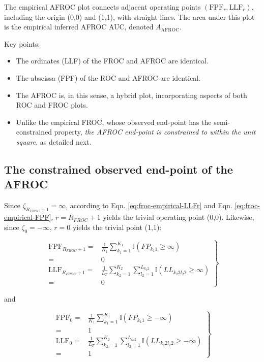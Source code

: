 \documentclass[
]{book}
\providecommand{\tightlist}{%
  \setlength{\itemsep}{0pt}\setlength{\parskip}{0pt}}
\begin{document}
The empirical AFROC plot connects adjacent operating points \(\left( \text{FPF}_r, \text{LLF}_r \right )\), including the origin (0,0) and (1,1), with straight lines. The area under this plot is the empirical inferred AFROC AUC, denoted \(A_{\text{AFROC}}\).

Key points:

\begin{itemize}
\tightlist
\item
  The ordinates (LLF) of the FROC and AFROC are identical.
\item
  The abscissa (FPF) of the ROC and AFROC are identical.
\item
  The AFROC is, in this sense, a hybrid plot, incorporating aspects of both ROC and FROC plots.
\item
  Unlike the empirical FROC, whose observed end-point has the semi-constrained property, \emph{the AFROC end-point is constrained to within the unit square}, as detailed next.
\end{itemize}

\hypertarget{froc-empirical-AFROC-constrained}{%
\subsection{The constrained observed end-point of the AFROC}\label{froc-empirical-AFROC-constrained}}

Since \(\zeta_{R_{FROC}+1} = \infty\), according to Eqn. \eqref{eq:froc-empirical-LLFr} and Eqn. \eqref{eq:froc-empirical-FPF}, \(r = R_{FROC}+1\) yields the trivial operating point (0,0). Likewise, since \(\zeta_0 = -\infty\), \(r = 0\) yields the trivial point (1,1):

\begin{equation}
\left.
\begin{aligned} 
\text{FPF}_{R_{FROC}+1} =& \frac{1}{K_1} \sum_{k_1=1}^{K_1} \mathbb{I} \left ( FP_{k_1 1} \geq \infty \right )\\
=& 0\\
\text{LLF}_{R_{FROC}+1} =& \frac{1}{L_T} \sum_{k_2=1}^{K_2} \sum_{l_2=1}^{L_{k_2 2}}\mathbb{I} \left ( LL_{k_2 2 l_2 2} \geq \infty \right )\\
=& 0
\end{aligned}
\right \}
\label{eq:froc-empirical-FPF-LLF-last}
\end{equation}

and

\begin{equation}
\left.
\begin{aligned} 
\text{FPF}_0 =& \frac{1}{K_1} \sum_{k_1=1}^{K_1} \mathbb{I} \left ( FP_{k_1 1} \geq -\infty \right )\\
=& 1\\
\text{LLF}_0 =& \frac{1}{L_T} \sum_{k_2=1}^{K_2} \sum_{l_2=1}^{L_{k_2 2}}\mathbb{I} \left ( LL_{k_2 2 l_2 2} \geq -\infty \right )\\
=& 1
\end{aligned}
\right \}
\label{eq:froc-empirical-FPF0-LLF0}
\end{equation}
\end{document}
